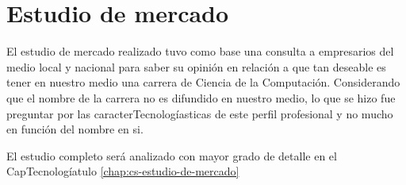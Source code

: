 \section{Estudio de mercado}\label{sec:cs-estudio-de-mercado}

El estudio de mercado realizado tuvo como base una consulta a empresarios del medio local y nacional 
para saber su opinión en relación a que tan deseable es tener en nuestro medio una carrera de 
Ciencia de la Computación. Considerando que el nombre de la carrera no es difundido en nuestro 
medio, lo que se hizo fue preguntar por las caracterTecnologíasticas de este perfil profesional y no 
mucho en función del nombre en si.

El estudio completo será analizado con mayor grado de detalle en el CapTecnologíatulo \ref{chap:cs-estudio-de-mercado}

